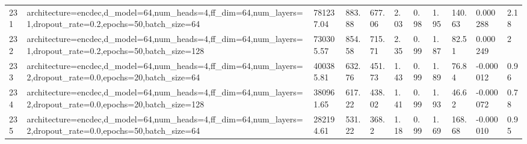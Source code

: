 \begin{longtable}{C{0.8cm} L{2cm} C{1.15cm} C{1.15cm} C{1.15cm} C{1.15cm} C{0.85cm} C{1.25cm} C{1.2cm} C{1.5cm} C{1.0cm}}
231 & architecture=encdec,\newline d\_model=64,\newline num\_heads=4,\newline ff\_dim=64,\newline num\_layers=1,\newline dropout\_rate=0.2,\newline epochs=50,\newline batch\_size=64 & 781237.04 & 883.88 & 677.06 & 2.03 & 0.98 & 1.95 & 140.63 & 0.000288 & 2.18 \\
232 & architecture=encdec,\newline d\_model=64,\newline num\_heads=4,\newline ff\_dim=64,\newline num\_layers=1,\newline dropout\_rate=0.2,\newline epochs=50,\newline batch\_size=128 & 730305.57 & 854.58 & 715.71 & 2.35 & 0.99 & 1.87 & 82.51 & 0.000249 & 2 \\
233 & architecture=encdec,\newline d\_model=64,\newline num\_heads=4,\newline ff\_dim=64,\newline num\_layers=2,\newline dropout\_rate=0.0,\newline epochs=20,\newline batch\_size=64 & 400385.81 & 632.76 & 451.73 & 1.43 & 0.99 & 1.89 & 76.84 & -0.000012 & 0.96 \\
234 & architecture=encdec,\newline d\_model=64,\newline num\_heads=4,\newline ff\_dim=64,\newline num\_layers=2,\newline dropout\_rate=0.0,\newline epochs=20,\newline batch\_size=128 & 380961.65 & 617.22 & 438.02 & 1.41 & 0.99 & 1.93 & 46.62 & -0.000072 & 0.78 \\
235 & architecture=encdec,\newline d\_model=64,\newline num\_heads=4,\newline ff\_dim=64,\newline num\_layers=2,\newline dropout\_rate=0.0,\newline epochs=50,\newline batch\_size=64 & 282194.61 & 531.22 & 368.2 & 1.18 & 0.99 & 1.69 & 168.68 & -0.000010 & 0.95 \\

\end{longtable}

